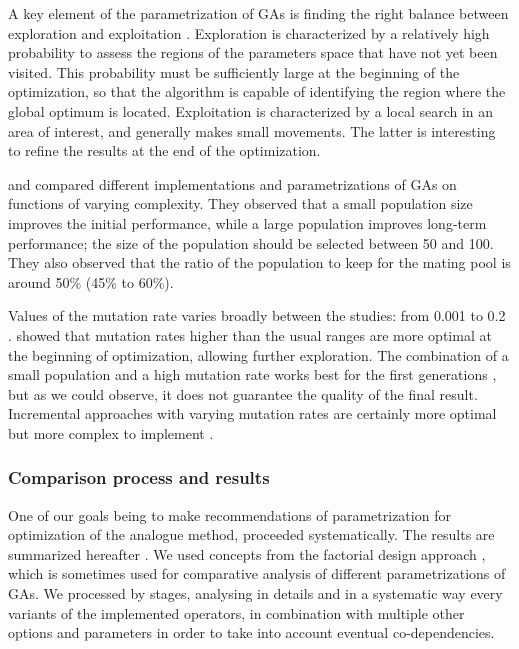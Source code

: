 \documentclass[twocol]{ametsoc}
\begin{document}
A key element of the parametrization of GAs is finding the right balance between exploration and exploitation \citep{Back1992a, Smith1997a}. Exploration is characterized by a relatively high probability to assess the regions of the parameters space that have not yet been visited. This probability must be sufficiently large at the beginning of the optimization, so that the algorithm is capable of identifying the region where the global optimum is located. Exploitation is characterized by a local search in an area of interest, and generally makes small movements. The latter is interesting to refine the results at the end of the optimization.

\citet{DeJong1975a} and \citet{Grefenstette1986} compared different implementations and parametrizations of GAs on functions of varying complexity. They observed that a small population size improves the initial performance, while a large population improves long-term performance; the size of the population should be selected between 50 and 100. They also observed that the ratio of the population to keep for the mating pool is around 50\% (45\% to 60\%).

Values of the mutation rate varies broadly between the studies: from 0.001 \citep{DeJong1975a} to 0.2 \citet{Haupt2004}. \citet{Back1996b} showed that mutation rates higher than the usual ranges are more optimal at the beginning of optimization, allowing further exploration. The combination of a small population and a high mutation rate works best for the first generations \citep{DeJong1975a, Back1996b, Haupt2004}, but as we could observe, it does not guarantee the quality of the final result. Incremental approaches with varying mutation rates are certainly more optimal but more complex to implement \citep{Back1996a, Back1996b}.


\subsubsection{Comparison process and results}

One of our goals being to make recommendations of parametrization for optimization of the analogue method, proceeded systematically. The results are summarized hereafter \citep[see][for the details]{Horton2012a}. We used concepts from the factorial design approach \citep[see eg.][]{Costa2005,Costa2007,Mariano2010}, which is sometimes used for comparative analysis of different parametrizations of GAs. We processed by stages, analysing in details and in a systematic way every variants of the implemented operators, in combination with multiple other options and parameters in order to take into account eventual co-dependencies. 
\end{document}
